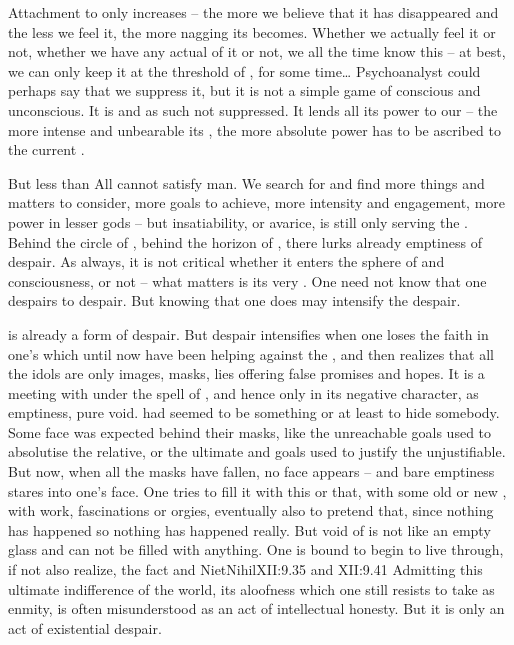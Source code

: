 
\label{sub:belial} %
{Attachment} to  only increases  -- the more we believe
that it has disappeared and the less we feel it, the more nagging its 
becomes. Whether we actually feel it or not, whether we have any actual
 of it or not, we all the time know this  -- at best, we
can only keep it at the threshold of , for some time\ldots
Psychoanalyst could perhaps say that we suppress it, but it is not a simple game
of conscious and unconscious. It is  and as such not suppressed. It
lends all its power to our  -- the more intense and unbearable its
, the more absolute power has to be ascribed to the current
.

But less than All cannot satisfy man. We search for and find more things and
matters to consider, more 
goals to achieve, more intensity and engagement, more power in lesser gods --
but insatiability, or avarice, is still only serving the . Behind the
circle of , behind the horizon of , there lurks already
emptiness of despair. As always, it is not critical whether it enters the sphere
of  and consciousness, or not -- what matters is its very
. One need not know that one despairs to despair. But knowing that
one does may intensify the despair. 

\pa {} is already a form of despair. But despair intensifies when one
loses the faith in one's  which until
now have been helping against the , and then realizes that all the
idols are only images, masks, lies offering false promises and hopes.
It is a meeting with  under the spell of , and
hence only in its negative character, as emptiness, pure void.  had
seemed to be something or at least to hide somebody. Some face was
expected behind their masks, like the unreachable goals used to absolutise the
relative, or the ultimate and  goals used to justify the
unjustifiable. But now, when all the masks have fallen, no face 
appears -- and bare emptiness stares into one's face. 
One tries to fill it with this or that, with some old or
new , with work, fascinations or orgies, eventually also to pretend
that, since  nothing has happened so nothing has happened
really. But void of  is not like an empty glass and can not be
filled with anything. One is bound to begin to live through, if not also
realize, the fact  and \citet{that all faith, all
  accepting as truth is by necessity a falsehood: for there is no 
  such thing as the true world.}{NietNihil}{XII:9.35 and XII:9.41
   }
Admitting this ultimate indifference of the world, its aloofness which one still
resists to take as enmity, 
is often misunderstood as an act of intellectual honesty. But it is only an
act of existential despair.


